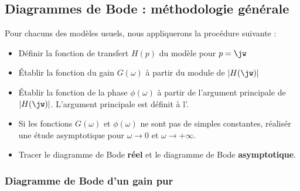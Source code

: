 \subsection{Diagrammes de Bode : méthodologie générale}
Pour chacuns des modèles usuels, nous appliquerons la procédure suivante :
\begin{itemize}
    \item Définir la fonction de transfert $H(p)$ du modèle pour $p=\jw$
    \item \'Etablir la fonction du gain $G(\omega)$ à partir du 
          module de $|H(\jw)|$
    \item \'Etablir la fonction de la phase $\phi(\omega)$ à partir de 
          l'argument principale de $|H(\jw)|$.
          L'argument principale est définit à l'.
    \item Si les fonctions $G(\omega)$ et $\phi(\omega)$ ne sont pas de 
          simples constantes, réalisér une étude
          asymptotique pour $\omega\rightarrow 0$ et 
          $\omega\rightarrow +\infty$.
    \item Tracer le diagramme de Bode \textbf{réel} et le diagramme 
          de Bode \textbf{asymptotique}.
\end{itemize}

\newpage

\subsubsection{Diagramme de Bode d'un gain pur}

